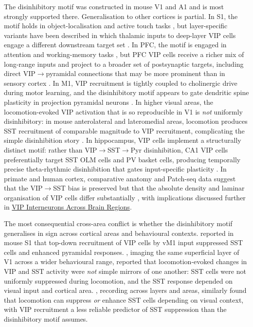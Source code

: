 \documentclass[11pt]{article}
\let\origrightarrow\rightarrow
\def\rightarrow{\ensuremath{\origrightarrow}}
\begin{document}
The disinhibitory motif was constructed in mouse V1 and A1 and is most strongly supported there. Generalisation to other cortices is partial. In S1, the motif holds in object-localisation and active touch tasks \citep{Williams2019, Sermet2019}, but layer-specific variants have been described in which thalamic inputs to deep-layer VIP cells engage a different downstream target set \citep{Munoz2017, Sermet2019, Garciajuncoclemente2017}. In PFC, the motif is engaged in attention and working-memory tasks \citep{Kamigaki2017, Pinto2015, Anastasiades2021a}, but PFC VIP cells receive a richer mix of long-range inputs and project to a broader set of postsynaptic targets, including direct VIP\rightarrow pyramidal connections that may be more prominent than in sensory cortex \citep{Anastasiades2021a, Schneidermizell2025}. In M1, VIP recruitment is tightly coupled to cholinergic drive during motor learning, and the disinhibitory motif appears to gate dendritic spine plasticity in projection pyramidal neurons \citep{Cichon2017}. In higher visual areas, the locomotion-evoked VIP activation that is so reproducible in V1 is \textit{not} uniformly disinhibitory: in mouse anterolateral and lateromedial areas, locomotion produces SST recruitment of comparable magnitude to VIP recruitment, complicating the simple disinhibition story \citep{Garrett2020}. In hippocampus, VIP cells implement a structurally distinct motif: rather than VIP\rightarrow SST\rightarrow Pyr disinhibition, CA1 VIP cells preferentially target SST OLM cells and PV basket cells, producing temporally precise theta-rhythmic disinhibition that gates input-specific plasticity \citep{Turi2019}. In primate and human cortex, comparative anatomy and Patch-seq data suggest that the VIP\rightarrow SST bias is preserved but that the absolute density and laminar organisation of VIP cells differ substantially \citep{Pronneke2015, Vanderveer2021}, with implications discussed further in \href{/cross-areas}{VIP Interneurons Across Brain Regions}.

The most consequential cross-area conflict is whether the disinhibitory motif generalises in sign across cortical areas and behavioural contexts. \citet{Lee2013} reported in mouse S1 that top-down recruitment of VIP cells by vM1 input suppressed SST cells and enhanced pyramidal responses. \citet{Pakan2016}, imaging the same superficial layer of V1 across a wider behavioural range, reported that locomotion-evoked changes in VIP and SST activity were \textit{not} simple mirrors of one another: SST cells were not uniformly suppressed during locomotion, and the SST response depended on visual input and cortical area. \citet{Dipoppa2018}, recording across layers and areas, similarly found that locomotion can suppress \textit{or} enhance SST cells depending on visual context, with VIP recruitment a less reliable predictor of SST suppression than the disinhibitory motif assumes.
\end{document}
